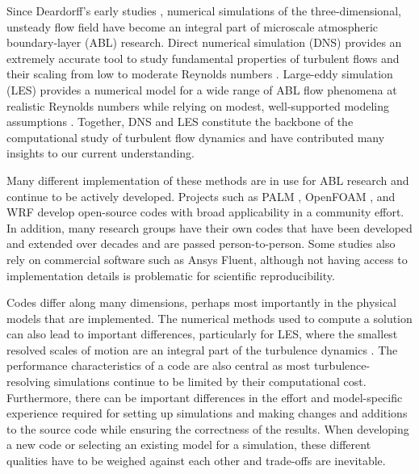 \documentclass[gmd, manuscript]{copernicus}
\begin{document}


\introduction  %

Since Deardorff's early studies \citep{Deardorff1969, Deardorff1970a, Deardorff1970b}, numerical simulations of the three-dimensional, unsteady flow field have become an integral part of microscale atmospheric boundary-layer (ABL) research.
Direct numerical simulation (DNS) provides an extremely accurate tool to study fundamental properties of turbulent flows and their scaling from low to moderate Reynolds numbers \citep{MoinMahesh1998}.
Large-eddy simulation (LES) provides a numerical model for a wide range of ABL flow phenomena at realistic Reynolds numbers while relying on modest, well-supported modeling assumptions \citep{MeneveauKatz2000, Stoll+2020}.
Together, DNS and LES constitute the backbone of the computational study of turbulent flow dynamics and have contributed many insights to our current understanding.

Many different implementation of these methods are in use for ABL research and continue to be actively developed.
Projects such as PALM \citep{Maronga+2020}, OpenFOAM \citep{Chen+2014}, and WRF \citep{Skamarock+2021} develop open-source codes with broad applicability in a community effort.
In addition, many research groups have their own codes that have been developed and extended over decades and are passed person-to-person.
Some studies also rely on commercial software such as Ansys Fluent, although not having access to implementation details is problematic for scientific reproducibility.

Codes differ along many dimensions, perhaps most importantly in the physical models that are implemented.
The numerical methods used to compute a solution can also lead to important differences, particularly for LES, where the smallest resolved scales of motion are an integral part of the turbulence dynamics \citep{KravchenkoMoin1997}.
The performance characteristics of a code are also central as most turbulence-resolving simulations continue to be limited by their computational cost.
Furthermore, there can be important differences in the effort and model-specific experience required for setting up simulations and making changes and additions to the source code while ensuring the correctness of the results.
When developing a new code or selecting an existing model for a simulation, these different qualities have to be weighed against each other and trade-offs are inevitable.
\end{document}
